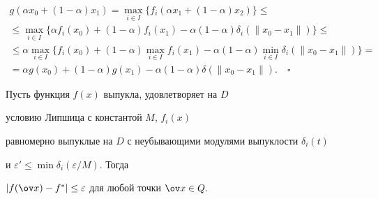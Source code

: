 \begin{multline*}


g(\alpha x_0+(1-\alpha) x_1)=


\max_{i\in I}\{f_i(\alpha x_1+(1-\alpha) x_2)\}\leq\\


\leq\max_{i\in I}\{\alpha f_i(x_0)+(1-\alpha)


f_i(x_1)-\alpha(1-\alpha)\delta_i(\|x_0-x_1\|)\}\leq\\


\leq\alpha\max_{i\in I}\{f_i(x_0)+(1-\alpha)


\max_{i\in I}f_i(x_1)-\alpha(1-\alpha)


\min_{i\in I}\delta_i(\|x_0-x_1\|)\}=\\


=\alpha g(x_0)+(1-\alpha)g(x_1)-\alpha(1-\alpha)\delta(\|x_0-x_1\|).


\quad\square


\end{multline*}





\begin{thm}\label{ogr}


Пусть функция $f(x)$ выпукла, удовлетворяет на $D$


условию Липшица с константой $M$, $f_i(x)$ 


равномерно выпуклые на $D$ с неубывающими модулями выпуклости $\delta_i(t)$ 


и $\varepsilon'\leq\min{\delta_i(\varepsilon/M)}.$ Тогда


$|f(\ov x)-f^*|\leq \varepsilon$ для любой точки $\ov x\in Q.$


\end{thm}






